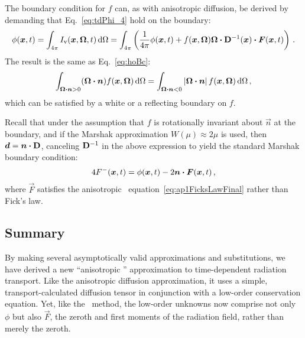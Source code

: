 The boundary condition for $f$ can, as with anisotropic diffusion, be derived by
demanding that Eq.~\eqref{eq:tdPhi_4} hold on the boundary:
\begin{equation*}
 \phi(\bm{x},t)
 = \int_{4\pi} I_\mathrm{v}(\bm{x},\bm{\Omega},t) \mathop{}\!\mathrm{d} \Omega
 = \int_{4\pi}  \left( 
\frac{1}{4\pi} \phi(\bm{x},t)
 + f(\bm{x},\bm{\Omega}) \bm{\Omega} \bm{\cdot}
  \mathbf{D}^{-1}(\bm{x}) \bm{\cdot} \bm{F}(\bm{x},t)
 \right) \,.
\end{equation*}
The result is the same as Eq.~\eqref{eq:hoBc}:
\begin{equation}\label{eq:hoBc_4}
  \int_{\bm{\Omega}\bm{\cdot}\bm{n} > 0} (\bm{\Omega}\bm{\cdot} \bm{n})
  f(\bm{x}, \bm{\Omega}) \mathop{}\!\mathrm{d}\Omega
  =
  \int_{\bm{\Omega}\bm{\cdot}\bm{n} < 0} \left| \bm{\Omega}\bm{\cdot} \bm{n} \right|
  f(\bm{x}, \bm{\Omega}) \mathop{}\!\mathrm{d}\Omega \,,
\end{equation}
which can be satisfied by a white or a reflecting boundary on $f$.

Recall that under the assumption that $f$ is rotationally invariant about
$\vec{n}$ at the boundary, and if the Marshak approximation $W(\mu) \approx
2\mu$ is used, then $\bm{d} = \bm{n} \bm{\cdot} \mathbf{D}$, canceling $\mathbf{D}^{-1}$ in
the above expression to yield the standard Marshak boundary condition:
\begin{equation*}
  4 F^-(\bm{x},t) =  \phi(\bm{x},t) - 2 \bm{n} \bm{\cdot} \bm{F}(\bm{x},t)\,,
\end{equation*}
where $\vec{F}$ satisfies the anisotropic \Pone\
equation~\eqref{eq:ap1FicksLawFinal} rather than Fick's law.


\subsection{Summary}

By making several asymptotically valid approximations and substitutions, we have
derived a new ``anisotropic \Pone'' approximation to time-dependent radiation
transport. Like the anisotropic diffusion approximation, it uses
a simple, transport-calculated diffusion tensor in conjunction with a low-order
conservation equation. Yet, like the \Pone\ method, the low-order unknowns now
comprise not only $\phi$ but also $\vec{F}$, the zeroth and first moments of the
radiation field, rather than merely the zeroth.

